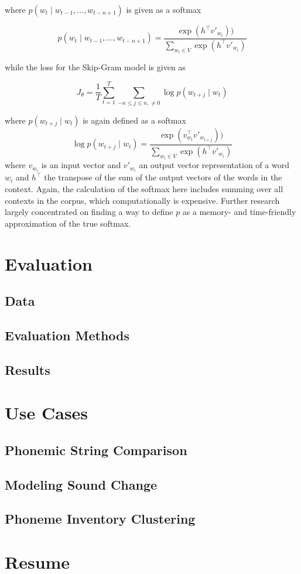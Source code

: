\documentclass[11pt]{article}
\begin{document}
where $p(w_{t}\mid w_{t-1},\dots,w_{t-n+1})$ is given as a softmax

\begin{equation}
p(w_{t}\mid w_{t-1},\dots,w_{t-n+1}) = \frac{\exp(h^\top v'_{w_{t}}))}{\sum_{w_i \in V} \exp(h^\top v'_{w_i})} 
\label{eq:cbow_softmax_prob}
\end{equation}

while the loss for the Skip-Gram model is given as

\begin{equation}
J_{\theta} = \frac{1}{T} \sum_{t=1}^{T}\sum_{-n\leq j\leq n,\neq 0}\log p(w_{t+j}\mid w_{t})
\label{eq:skipgram_loss}
\end{equation}

where $p(w_{t+j}\mid w_{t})$ is again defined as a softmax
\begin{equation}
\log p(w_{t+j}\mid w_{t}) = \frac{\exp(v_{w_{t}}^\top v'_{w_{t+j}}))}{\sum_{w_i \in V} \exp(h^\top v'_{w_i})}
\label{eq:skipgram_softmax_prob}
\end{equation}
where $v_w_i$ is an input vector and $v'_w_i$ an output vector representation of a word $w_i$ and $h^\top$ the transpose of the sum of the output vectors of the words in the context. Again, the calculation of the softmax here includes summing over all contexts in the corpus, which computationally is expensive. Further research largely concentrated on finding a way to define $p$ as a memory- and time-friendly approximation of the true softmax.

\section{Evaluation}
\subsection{Data}
\subsection{Evaluation Methods}
\subsection{Results}
\section{Use Cases}
\subsection{Phonemic String Comparison}
\subsection{Modeling Sound Change}
\subsection{Phoneme Inventory Clustering}
\section{Resume}



 
\end{document}
